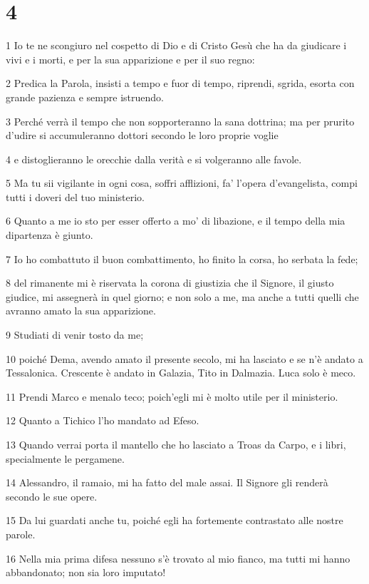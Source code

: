 \chapter{4}

\par 1 Io te ne scongiuro nel cospetto di Dio e di Cristo Gesù che ha da giudicare i vivi e i morti, e per la sua apparizione e per il suo regno:
\par 2 Predica la Parola, insisti a tempo e fuor di tempo, riprendi, sgrida, esorta con grande pazienza e sempre istruendo.
\par 3 Perché verrà il tempo che non sopporteranno la sana dottrina; ma per prurito d'udire si accumuleranno dottori secondo le loro proprie voglie
\par 4 e distoglieranno le orecchie dalla verità e si volgeranno alle favole.
\par 5 Ma tu sii vigilante in ogni cosa, soffri afflizioni, fa' l'opera d'evangelista, compi tutti i doveri del tuo ministerio.
\par 6 Quanto a me io sto per esser offerto a mo' di libazione, e il tempo della mia dipartenza è giunto.
\par 7 Io ho combattuto il buon combattimento, ho finito la corsa, ho serbata la fede;
\par 8 del rimanente mi è riservata la corona di giustizia che il Signore, il giusto giudice, mi assegnerà in quel giorno; e non solo a me, ma anche a tutti quelli che avranno amato la sua apparizione.
\par 9 Studiati di venir tosto da me;
\par 10 poiché Dema, avendo amato il presente secolo, mi ha lasciato e se n'è andato a Tessalonica. Crescente è andato in Galazia, Tito in Dalmazia. Luca solo è meco.
\par 11 Prendi Marco e menalo teco; poich'egli mi è molto utile per il ministerio.
\par 12 Quanto a Tichico l'ho mandato ad Efeso.
\par 13 Quando verrai porta il mantello che ho lasciato a Troas da Carpo, e i libri, specialmente le pergamene.
\par 14 Alessandro, il ramaio, mi ha fatto del male assai. Il Signore gli renderà secondo le sue opere.
\par 15 Da lui guardati anche tu, poiché egli ha fortemente contrastato alle nostre parole.
\par 16 Nella mia prima difesa nessuno s'è trovato al mio fianco, ma tutti mi hanno abbandonato; non sia loro imputato!
